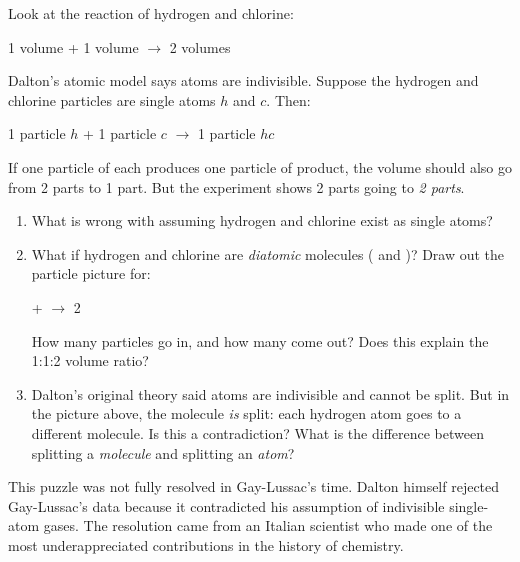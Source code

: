 \documentclass[12pt, a4paper]{book}
\theoremstyle{definition}
\begin{document}
\begin{puzzlebox}
Look at the reaction of hydrogen and chlorine:
\begin{center}
1 volume  + 1 volume  $\longrightarrow$ 2 volumes 
\end{center}

Dalton's atomic model says atoms are indivisible.
Suppose the hydrogen and chlorine particles are single atoms
$h$ and $c$.
Then:
\begin{center}
1 particle $h$ + 1 particle $c$ $\longrightarrow$ 1 particle $hc$
\end{center}

If one particle of each produces one particle of product,
the volume should also go from 2 parts to 1 part.
But the experiment shows 2 parts going to \emph{2 parts}.

\begin{enumerate}[label=(\alph*), leftmargin=*]
  \item What is wrong with assuming hydrogen and chlorine
        exist as single atoms?

  \item What if hydrogen and chlorine are \emph{diatomic}
        molecules ( and )?
        Draw out the particle picture for:
        \begin{center}
         +  $\longrightarrow$ 2 
        \end{center}
        How many particles go in, and how many come out?
        Does this explain the 1:1:2 volume ratio?

  \item Dalton's original theory said atoms are indivisible
        and cannot be split.
        But in the picture above, the  molecule
        \emph{is} split: each hydrogen atom goes to a different
         molecule.
        Is this a contradiction?
        What is the difference between splitting a \emph{molecule}
        and splitting an \emph{atom}?
\end{enumerate}
\end{puzzlebox}

\vspace{0.5em}

This puzzle was not fully resolved in Gay-Lussac's time.
Dalton himself rejected Gay-Lussac's data because it
contradicted his assumption of indivisible single-atom gases.
The resolution came from an Italian scientist
who made one of the most underappreciated contributions
in the history of chemistry.
\end{document}
